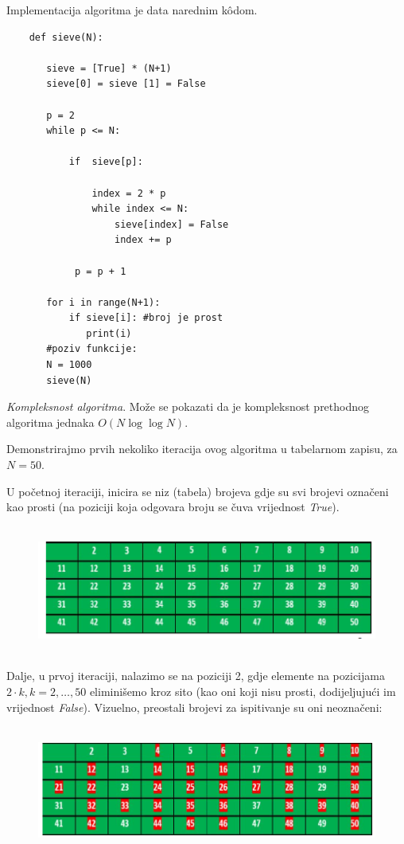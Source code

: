 Implementacija algoritma je data narednim k\^odom. 

\begin{verbatim}
	def sieve(N):
	   
	   sieve = [True] * (N+1)
	   sieve[0] = sieve [1] = False
	   
	   p = 2
	   while p <= N:
	       
	       if  sieve[p]:
	        
	           index = 2 * p
	           while index <= N:
	               sieve[index] = False
	               index += p
	           
	        p = p + 1
	   
	   for i in range(N+1):
	       if sieve[i]: #broj je prost
	          print(i)
       #poziv funkcije:
       N = 1000
       sieve(N)
\end{verbatim}  
\textit{Kompleksnost algoritma}.  Može se pokazati da je kompleksnost prethodnog algoritma jednaka $O(N \log\log N )$. 


Demonstrirajmo   prvih nekoliko iteracija ovog algoritma u tabelarnom zapisu, za $N=50.$ 

U početnoj iteraciji, inicira se niz (tabela) brojeva gdje su svi brojevi označeni kao prosti (na poziciji koja odgovara broju se čuva vrijednost \emph{True}).

\begin{figure}[H]
	 \centering
	 \includegraphics[width=340pt,height=120pt]{slike/sieve-it-0.png}
\end{figure}


Dalje, u prvoj iteraciji, nalazimo se na poziciji 2, gdje elemente na pozicijama $2 \cdot k, k=2, \ldots, 50$ eliminišemo kroz sito (kao oni koji nisu prosti, dodijeljujući im vrijednost \emph{False}). Vizuelno, preostali brojevi za ispitivanje su oni neoznačeni:


\begin{figure}[H]
	\centering
	\includegraphics[width=340pt,height=120pt]{slike/sieve-it-1.png}
\end{figure}



